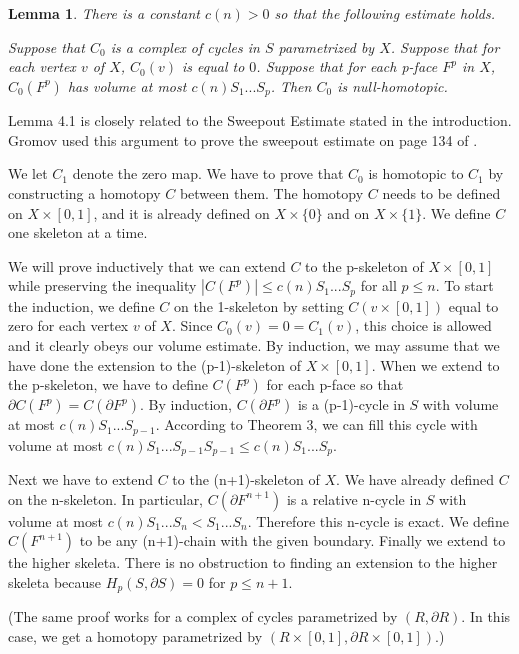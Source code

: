 \documentclass{amsart}
\newtheorem*{Theorem 1}{Theorem 1}
\newtheorem*{Theorem 2}{Theorem 2}
\newtheorem*{Estimate 1}{Estimate 1}
\newtheorem*{Estimate 2}{Estimate 2}
\newtheorem*{key lemma}{Key Lemma}
\newtheorem{lemma}{Lemma}[section]
\numberwithin{equation}{section}
\begin{document}
\begin{lemma} There is a constant $c(n) > 0$ so that the
following estimate holds.

Suppose that $C_0$ is a complex of cycles in $S$ parametrized by $X$. 
Suppose that for each vertex $v$ of $X$, $C_0(v)$ is equal to
$0$.  Suppose that for each p-face $F^p$ in $X$, $C_0(F^p)$ has
volume at most $c(n) S_1 ... S_p$.  Then $C_0$ is null-homotopic.
\end{lemma}

Lemma 4.1 is closely related to the Sweepout Estimate stated in
the introduction.  Gromov used this argument to prove the
sweepout estimate on page 134 of \cite{Gr}.

\proof We let $C_1$ denote the zero map.  We have to prove that
$C_0$ is homotopic to $C_1$ by constructing a homotopy $C$ between
them.  The homotopy $C$ needs to be defined on $X \times [0,1]$,
and it is already defined on $X \times \{ 0 \}$ and on $X \times
\{ 1 \}$.  We define $C$ one skeleton at a time.

We will prove inductively that we can extend $C$ to the
p-skeleton of $X \times [0,1]$ while preserving the inequality
$|C(F^p)| \le c(n) S_1 ... S_p$ for all $p \le n$.  
To start the induction, we
define $C$ on the 1-skeleton by setting $C(v \times [0,1])$ equal
to zero for each vertex $v$ of $X$.  Since $C_0(v) = 0 = C_1(v)$,
this choice is allowed and it clearly obeys our volume estimate.
By induction, we may assume that we have done the extension to
the (p-1)-skeleton of $X
\times [0,1]$.  When we extend to the p-skeleton, we have to
define $C(F^p)$ for each p-face so that $\partial C(F^p) =
C(\partial F^p)$.  By induction, $C(\partial F^p)$ is a
(p-1)-cycle in $S$ with volume at most $c(n) S_1 ... S_{p-1}$. 
According to Theorem 3, we can fill this cycle with volume at
most $c(n) S_1 ... S_{p-1} S_{p-1} \le c(n) S_1 ... S_p$.

Next we have to extend $C$ to the (n+1)-skeleton of $X$.  We
have already defined $C$ on the n-skeleton.  In particular,
$C(\partial F^{n+1})$ is a relative n-cycle in $S$ with
volume at most $c(n) S_1 ... S_n < S_1 ... S_n$.  Therefore
this n-cycle is exact.  We define $C(F^{n+1})$ to be any
(n+1)-chain with the given boundary.  Finally we extend
to the higher skeleta.  There is no obstruction to finding an
extension to the higher skeleta because $H_p(S, \partial S) = 0$
for $p \le n+1$.
\endproof

(The same proof works for a complex of cycles parametrized by
$(R, \partial R)$. In this case, we get a homotopy parametrized
by $(R \times [0,1], \partial R \times [0,1])$.)
\end{document}

